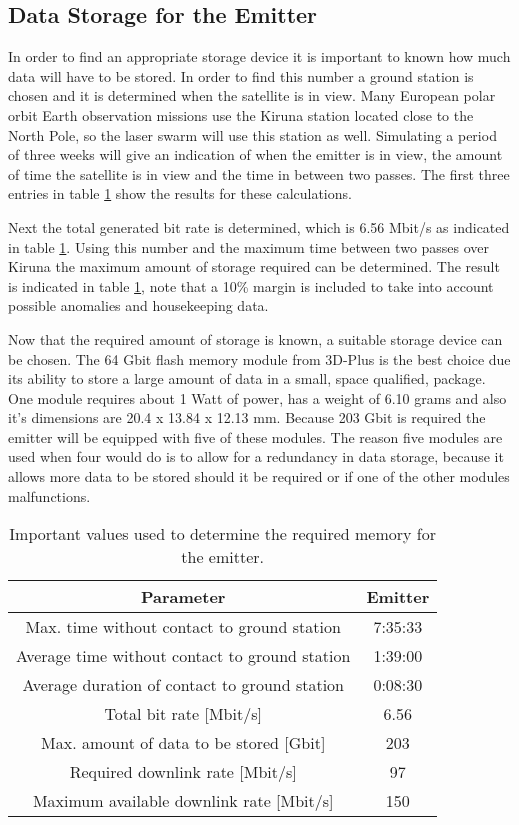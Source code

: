 \subsection{Data Storage for the Emitter}
\label{DSEmitter}

In order to find an appropriate storage device it is important to known how much data will have to be stored. In order to find this number a ground station is chosen and it is determined when the satellite is in view. Many European polar orbit Earth observation missions use the Kiruna station located close to the North Pole, so the laser swarm will use this station as well. Simulating a period of three weeks will give an indication of when the emitter is in view, the amount of time the satellite is in view and the time in between two passes. The first three entries in table \ref{DSEmitterTable} show the results for these calculations.

Next the total generated bit rate is determined, which is 6.56 Mbit/s as indicated in table \ref{DSEmitterTable}. Using this number and the maximum time between two passes over Kiruna the maximum amount of storage required can be determined. The result is indicated in table \ref{DSEmitterTable}, note that a 10\% margin is included to take into account possible anomalies and housekeeping data. 

Now that the required amount of storage is known, a suitable storage device can be chosen. The 64 Gbit flash memory module from 3D-Plus \cite{DataStorage} is the best choice due its ability to store a large amount of data in a small, space qualified, package. One module requires about 1 Watt of power, has a weight of 6.10 grams and also it's dimensions are 20.4 x 13.84 x 12.13 mm. Because 203 Gbit is required the emitter will be equipped with five of these modules. The reason five modules are used when four would do is to allow for a redundancy in data storage, because it allows more data to be stored should it be required or if one of the other modules malfunctions.

\begin{table}
\centering
\begin{tabular}{c|c}
\hline
\textbf{Parameter}  & \textbf{Emitter} \\\hline\hline
	Max. time without contact to ground station & 7:35:33 \\
	Average time without contact to ground station & 1:39:00  \\
	Average duration of contact to ground station & 0:08:30 \\
	Total bit rate [Mbit/s] & 6.56 \\
	Max. amount of data to be stored [Gbit] & 203 \\
	Required downlink rate [Mbit/s] & 97 \\
	Maximum available downlink rate [Mbit/s] & 150 \\\hline
\end{tabular}
\caption{Important values used to determine the required memory for the emitter.}
\label{DSEmitterTable}
\end{table}

